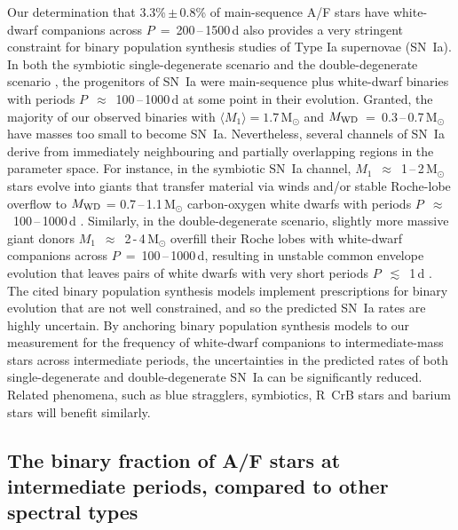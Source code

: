 \documentclass[a4paper,fleqn,usenatbib]{mnras}
\begin{document}
Our determination that 3.3\%\,$\pm$\,0.8\% of main-sequence A/F stars have white-dwarf companions across $P$~=~200\,--\,1500\,d also provides a very stringent constraint for binary population synthesis studies of Type Ia supernovae (SN~Ia).  In both the symbiotic single-degenerate scenario \citep{patatetal2011,chenetal2011} and the double-degenerate scenario \citep{iben&tutukov1984,webbink1984}, the progenitors of SN~Ia were main-sequence plus white-dwarf binaries with periods $P$~$\approx$~100\,--\,1000\,d at some point in their evolution.  Granted, the majority of our observed binaries with $\langle M_1 \rangle = 1.7$\,M$_{\odot}$ and $M_{\rm WD}$~=~0.3\,--\,0.7\,M$_{\odot}$ have masses too small to become SN~Ia.  Nevertheless, several channels of SN~Ia derive from immediately neighbouring and partially overlapping regions in the parameter space.  For instance, in the symbiotic SN~Ia channel, $M_1$~$\approx$~1\,--\,2\,M$_{\odot}$ stars evolve into giants that transfer material via winds and/or stable Roche-lobe overflow to $M_{\rm WD}$ = 0.7\,--\,1.1\,M$_{\odot}$ carbon-oxygen white dwarfs with periods $P$~$\approx$~100\,--\,1000\,d \citep{chenetal2011}.  Similarly, in the double-degenerate scenario, slightly more massive giant donors $M_1$~$\approx$~2\,-\,4\,M$_{\odot}$ overfill their Roche lobes with white-dwarf companions across $P$~=~100\,--\,1000\,d, resulting in unstable common envelope evolution that leaves pairs of white dwarfs with very short periods $P$~$\lesssim$~1\,d \citep{ruiteretal2009,mennekensetal2010,claeysetal2014}.  The cited binary population synthesis models implement prescriptions for binary evolution that are not well constrained, and so the predicted SN~Ia rates are highly uncertain.  By anchoring binary population synthesis models to our measurement for the frequency of white-dwarf companions to intermediate-mass stars across intermediate periods, the uncertainties in the predicted rates of both single-degenerate and double-degenerate SN~Ia can be significantly reduced.  Related phenomena, such as blue stragglers, symbiotics, R~CrB stars and barium stars will benefit similarly.



\subsection{The binary fraction of A/F stars at intermediate periods, compared to other spectral types}
\end{document}

